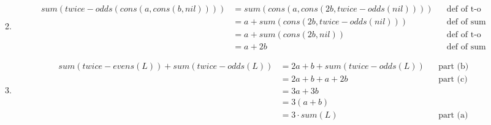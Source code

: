 \documentclass[12pt]{article}
\theoremstyle{definitionstyle}
\begin{document}
\begin{enumerate}[leftmargin=\labelsep]
\begin{enumerate}[label=(\alph*)]
$$\begin{aligned}
            \end{aligned}$$
            \item $$\begin{aligned}
                sum(twice-odds(cons(a, cons(b, nil)))) &= sum(cons(a, cons(2b, twice-odds(nil)))) && \text{def of t-o} \\
                &= a + sum(cons(2b, twice-odds(nil))) && \text{def of sum} \\
                &= a + sum(cons(2b, nil)) && \text{def of t-o} \\
                &= a + 2b && \text{def of sum}
            \end{aligned}$$
            \item 
            $$\begin{aligned}
                sum(twice-evens(L)) + sum(twice-odds(L)) &= 2a + b + sum(twice-odds(L))&& \text{part (b)} \\
                &=2a + b + a + 2b && \text{part (c)} \\
                &=3a + 3b \\
                &= 3(a+b) \\
                &= 3 \cdot sum(L) && \text{part (a)}
            \end{aligned}$$
        \end{enumerate}


\end{enumerate}
\end{document}
